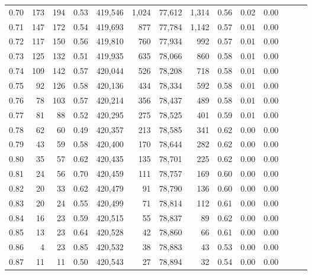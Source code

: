 \begin{tabular}{rrrrrrrrrrrrrr}
0.70 &     173 &    194 &  0.53 &  419,546 &    1,024 &  77,612 &   1,314 &  0.56 &  0.02 &      0.00 \\
0.71 &     147 &    172 &  0.54 &  419,693 &      877 &  77,784 &   1,142 &  0.57 &  0.01 &      0.00 \\
0.72 &     117 &    150 &  0.56 &  419,810 &      760 &  77,934 &     992 &  0.57 &  0.01 &      0.00 \\
0.73 &     125 &    132 &  0.51 &  419,935 &      635 &  78,066 &     860 &  0.58 &  0.01 &      0.00 \\
0.74 &     109 &    142 &  0.57 &  420,044 &      526 &  78,208 &     718 &  0.58 &  0.01 &      0.00 \\
0.75 &      92 &    126 &  0.58 &  420,136 &      434 &  78,334 &     592 &  0.58 &  0.01 &      0.00 \\
0.76 &      78 &    103 &  0.57 &  420,214 &      356 &  78,437 &     489 &  0.58 &  0.01 &      0.00 \\
0.77 &      81 &     88 &  0.52 &  420,295 &      275 &  78,525 &     401 &  0.59 &  0.01 &      0.00 \\
0.78 &      62 &     60 &  0.49 &  420,357 &      213 &  78,585 &     341 &  0.62 &  0.00 &      0.00 \\
0.79 &      43 &     59 &  0.58 &  420,400 &      170 &  78,644 &     282 &  0.62 &  0.00 &      0.00 \\
0.80 &      35 &     57 &  0.62 &  420,435 &      135 &  78,701 &     225 &  0.62 &  0.00 &      0.00 \\
0.81 &      24 &     56 &  0.70 &  420,459 &      111 &  78,757 &     169 &  0.60 &  0.00 &      0.00 \\
0.82 &      20 &     33 &  0.62 &  420,479 &       91 &  78,790 &     136 &  0.60 &  0.00 &      0.00 \\
0.83 &      20 &     24 &  0.55 &  420,499 &       71 &  78,814 &     112 &  0.61 &  0.00 &      0.00 \\
0.84 &      16 &     23 &  0.59 &  420,515 &       55 &  78,837 &      89 &  0.62 &  0.00 &      0.00 \\
0.85 &      13 &     23 &  0.64 &  420,528 &       42 &  78,860 &      66 &  0.61 &  0.00 &      0.00 \\
0.86 &       4 &     23 &  0.85 &  420,532 &       38 &  78,883 &      43 &  0.53 &  0.00 &      0.00 \\
0.87 &      11 &     11 &  0.50 &  420,543 &       27 &  78,894 &      32 &  0.54 &  0.00 &      0.00 \\

\end{tabular}
